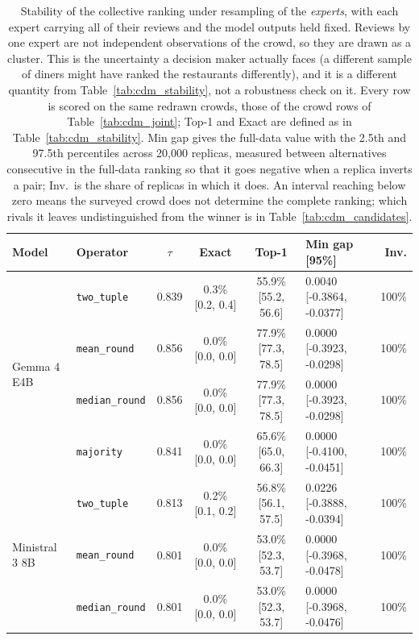 \begin{table}[htbp]
\centering
\caption{Stability of the collective ranking under resampling of the \emph{experts}, with each expert carrying all of their reviews and the model outputs held fixed. Reviews by one expert are not independent observations of the crowd, so they are drawn as a cluster. This is the uncertainty a decision maker actually faces (a different sample of diners might have ranked the restaurants differently), and it is a different quantity from Table~\ref{tab:cdm_stability}, not a robustness check on it. Every row is scored on the same redrawn crowds, those of the crowd rows of Table~\ref{tab:cdm_joint}; Top-1 and Exact are defined as in Table~\ref{tab:cdm_stability}. Min gap gives the full-data value with the 2.5th and 97.5th percentiles across 20{,}000 replicas, measured between alternatives consecutive in the full-data ranking so that it goes negative when a replica inverts a pair; Inv.\ is the share of replicas in which it does. An interval reaching below zero means the surveyed crowd does not determine the complete ranking; which rivals it leaves undistinguished from the winner is in Table~\ref{tab:cdm_candidates}.}
\label{tab:cdm_crowd}
\small
\begin{tabular}{llccclr}
\toprule
\textbf{Model} & \textbf{Operator} & \textbf{$\tau$} & \textbf{Exact} & \textbf{Top-1} & \textbf{Min gap [95\%]} & \textbf{Inv.} \\
\midrule
  \multirow{4}{*}{Gemma 4 E4B} & \texttt{two\_tuple} & 0.839 & 0.3\% \tiny[0.2, 0.4] & 55.9\% \tiny[55.2, 56.6] & 0.0040 [-0.3864, -0.0377] & 100\% \\
   & \texttt{mean\_round} & 0.856 & 0.0\% \tiny[0.0, 0.0] & 77.9\% \tiny[77.3, 78.5] & 0.0000 [-0.3923, -0.0298] & 100\% \\
   & \texttt{median\_round} & 0.856 & 0.0\% \tiny[0.0, 0.0] & 77.9\% \tiny[77.3, 78.5] & 0.0000 [-0.3923, -0.0298] & 100\% \\
   & \texttt{majority} & 0.841 & 0.0\% \tiny[0.0, 0.0] & 65.6\% \tiny[65.0, 66.3] & 0.0000 [-0.4100, -0.0451] & 100\% \\
\midrule
  \multirow{4}{*}{Ministral 3 8B} & \texttt{two\_tuple} & 0.813 & 0.2\% \tiny[0.1, 0.2] & 56.8\% \tiny[56.1, 57.5] & 0.0226 [-0.3888, -0.0394] & 100\% \\
   & \texttt{mean\_round} & 0.801 & 0.0\% \tiny[0.0, 0.0] & 53.0\% \tiny[52.3, 53.7] & 0.0000 [-0.3968, -0.0478] & 100\% \\
   & \texttt{median\_round} & 0.801 & 0.0\% \tiny[0.0, 0.0] & 53.0\% \tiny[52.3, 53.7] & 0.0000 [-0.3968, -0.0476] & 100\% \\

\end{tabular}
\end{table}
